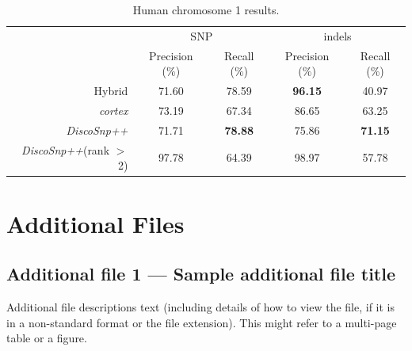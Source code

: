 \documentclass{bmcart}
\newcommand{\discopp}{{\it DiscoSnp++}\xspace}
\newcommand{\co}{{\it cortex}\xspace}
\begin{document}
\begin{backmatter}
	

\begin{table}[h!]
	\caption{Human chromosome 1 results.  \label{tab:humanresults} }
	\begin{tabular}{r|cc|cc}
		 & \multicolumn{2}{c|}{SNP} & \multicolumn{2}{c}{indels}\\
		 & Precision (\%) & Recall (\%) & Precision (\%) & Recall (\%) \\\hline
		 Hybrid & 71.60 & 78.59 & \textbf{96.15} & 40.97\\
		 \co& {73.19} & 67.34 & 86.65 & 63.25 \\
		 \discopp& 71.71 & \textbf{78.88} & 75.86 & \textbf{71.15} \\\hline
		 \discopp (rank $>$ 2)& 97.78 & 64.39 & 98.97 & 57.78 
	\end{tabular}
	\end{table}


\section*{Additional Files}
  \subsection*{Additional file 1 --- Sample additional file title}
    Additional file descriptions text (including details of how to
    view the file, if it is in a non-standard format or the file extension).  This might
    refer to a multi-page table or a figure.


\end{backmatter}
\end{document}
